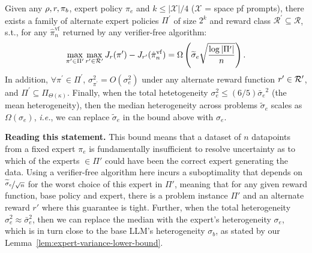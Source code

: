 {
\begin{tcolorbox}[colback=red!6!white,colframe=black,boxsep=0pt,top=4pt,bottom=4pt,left=3pt,right=3pt]
\begin{theorem}
\label{thm:verifier-free-thm} Given any $\rho, r, \pi_b$, expert policy $\pi_e$ and $k \le |\mathcal{X}|/4$ ($\mathcal{X}$ = space pf prompts), there exists a family of alternate expert policies $\Pi^\prime$ of size $2^k$ and reward class $\mathcal{R}^\prime \subseteq \mathcal{R}$, s.t., for any $\hat{\pi}_n^\mathrm{vf}$ returned by any verifier-free algorithm: 
{
\setlength{\belowdisplayskip}{4pt}
\setlength{\abovedisplayskip}{4pt}
    \begin{align*}
        \max_{\pi^\prime \in \Pi^\prime} \max_{r^\prime \in \mathcal{R}^\prime}  J_{r} (\pi^\prime) - J_{r^\prime} (\hat{\pi}_n^\mathrm{vf}) = \Omega\left( \widetilde{\sigma}_e \sqrt{\frac{\log |\Pi^\prime|}{n}} \right).
    \end{align*}
In addition, $\forall \pi^\prime \in \Pi^\prime$, $\sigma^2_{\pi^\prime} = O(\sigma_e^2)$ under any alternate reward function $r^\prime \in {\mathcal{R}}^\prime$, and $\Pi^\prime \subseteq \Pi_{\Theta(\kappa)}$. Finally, when the total hetetogeneity $\sigma_e^2 \le (6/5) {\bar{\sigma}_e}^2$ (the mean heterogeneity), then the median heterogeneity across problems $\widetilde{\sigma}_e$ scales as $\Omega(\sigma_e)$, \textit{i.e.}, we can replace $\tilde{\sigma}_e$ in the bound above with $\sigma_e$.
}
\end{theorem}
\end{tcolorbox}
}


\textbf{Reading this statement.} This bound means that a dataset of $n$ datapoints from a fixed expert $\pi_e$ is fundamentally insufficient to resolve uncertainty as to which of the experts $\in \Pi'$ could have been the correct expert generating the data. Using a verifier-free algorithm here incurs a suboptimality that depends on $\nicefrac{\widetilde{\sigma}_e}{\sqrt{n}}$ for the worst choice of this expert in $\Pi'$, meaning that for any given reward function, base policy and expert, there is a problem instance $\Pi'$ and an alternate reward $r'$ where this guarantee is tight. Further, when the total heterogeneity $\sigma^2_e \approx \bar{\sigma}_e^2$, then we can replace the median with the expert's heterogeneity $\sigma_e$, which is in turn close to the base LLM's heterogeneity $\sigma_b$, as stated by our Lemma~\ref{lem:expert-variance-lower-bound}. 

